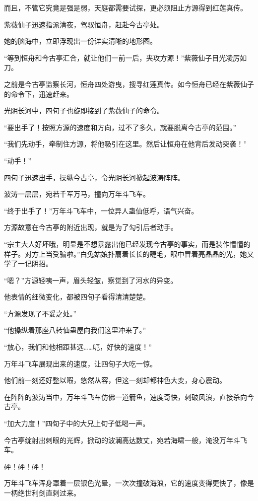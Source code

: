 \begin{this_body}
而且，不管它究竟是强是弱，天庭都需要试探，更必须阻止方源得到红莲真传。

紫薇仙子迅速指派清夜，驾驭恒舟，赶赴今古亭处。

她的脑海中，立即浮现出一份详实清晰的地形图。

“等到恒舟和今古亭汇合，就让他们一前一后，夹攻方源！”紫薇仙子目光凌厉如刀。

之前是今古亭监察长河，恒舟四处游曳，搜寻红莲真传。如今恒舟已经在紫薇仙子的命令下，迅速赶来。

光阴长河中，四旬子也旋即接到了紫薇仙子的命令。

“要出手了！按照方源的速度和方向，过不了多久，就要脱离今古亭的范围。”

“我们先动手，牵制住方源，将他吸引在这里。然后让恒舟在他背后发动突袭！”

“动手！”

四旬子迅速出手，操纵今古亭，令光阴长河掀起波涛阵阵。

波涛一层层，宛若千军万马，撞向万年斗飞车。

“终于出手了！”万年斗飞车中，一位异人蛊仙低呼，语气兴奋。

方源故意在今古亭的附近出现，就是为了勾引后者动手。

“宗主大人好坏哦，明显是不想暴露出他已经发现今古亭的事实，而是装作懵懂的样子。对方上当受骗啦。”白兔姑娘扑扇着长长的睫毛，眼中冒着亮晶晶的光，她又学了一记阴招。

“嗯？”方源轻咦一声，眉头轻皱，察觉到了河水的异变。

他表情的细微变化，都被四旬子看得清清楚楚。

“方源发现了不妥之处。”

“他操纵着那座八转仙蛊屋向我们这里冲来了。”

“放心，我们和他相距甚远……呃，好快的速度！”

万年斗飞车展现出来的速度，让四旬子大吃一惊。

他们前一刻还好整以暇，悠然从容，但这一刻却都神色大变，身心震动。

在阵阵的波涛当中，万年斗飞车仿佛一道箭鱼，速度奇快，刺破风浪，直接杀向今古亭。

“加大力度！”四旬子中的大兄上旬子低喝一声。

今古亭绽射出刺眼的光辉，掀动的波澜高达数丈，宛若海啸一般，淹没万年斗飞车。

砰！砰！砰！

万年斗飞车浑身罩着一层银色光晕，一次次撞破海浪，它的速度变得更快了，像是一柄绝世利剑直刺过来。


\end{this_body}

